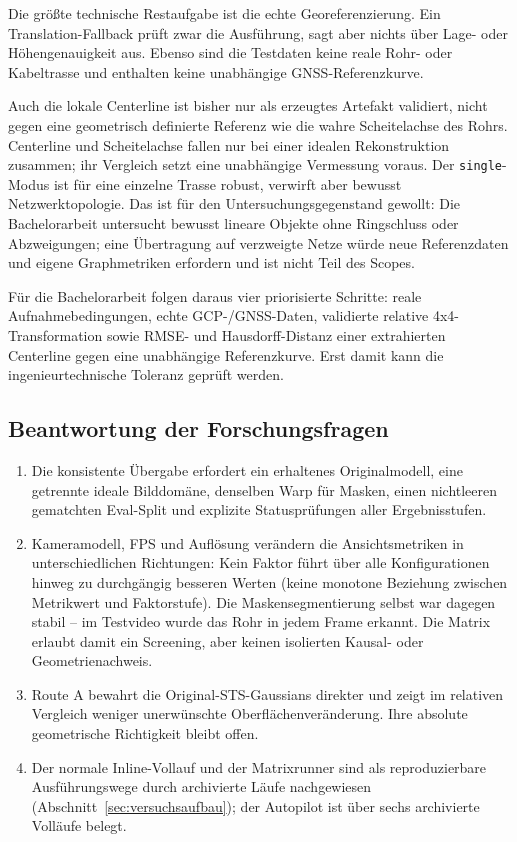 Die größte technische Restaufgabe ist die echte Georeferenzierung. Ein
Translation-Fallback prüft zwar die Ausführung, sagt aber nichts über Lage-
oder Höhengenauigkeit aus. Ebenso sind die Testdaten keine reale Rohr- oder
Kabeltrasse und enthalten keine unabhängige GNSS-Referenzkurve.

Auch die lokale Centerline ist bisher nur als erzeugtes Artefakt validiert,
nicht gegen eine geometrisch definierte Referenz wie die wahre Scheitelachse
des Rohrs. Centerline und Scheitelachse fallen nur bei einer idealen
Rekonstruktion zusammen; ihr Vergleich setzt eine unabhängige Vermessung
voraus. Der \texttt{single}-Modus ist für eine einzelne Trasse robust,
verwirft aber bewusst Netzwerktopologie. Das ist für den Untersuchungsgegenstand
gewollt: Die Bachelorarbeit untersucht bewusst lineare Objekte ohne
Ringschluss oder Abzweigungen; eine Übertragung auf verzweigte Netze würde
neue Referenzdaten und eigene Graphmetriken erfordern und ist nicht Teil des
Scopes.

Für die Bachelorarbeit folgen daraus vier priorisierte Schritte: reale
Aufnahmebedingungen, echte GCP-/GNSS-Daten, validierte relative
4x4-Transformation sowie RMSE- und Hausdorff-Distanz einer extrahierten
Centerline gegen eine unabhängige Referenzkurve. Erst damit kann die
ingenieurtechnische Toleranz geprüft werden.

\subsection{Beantwortung der Forschungsfragen}

\begin{enumerate}
  \item Die konsistente Übergabe erfordert ein erhaltenes Originalmodell, eine
	  getrennte ideale Bilddomäne, denselben Warp für Masken, einen
	  nichtleeren gematchten Eval-Split und explizite Statusprüfungen aller
	  Ergebnisstufen.
  \item Kameramodell, FPS und Auflösung verändern die Ansichtsmetriken in
	  unterschiedlichen Richtungen: Kein Faktor führt über alle Konfigurationen
	  hinweg zu durchgängig besseren Werten (keine monotone Beziehung zwischen
	  Metrikwert und Faktorstufe). Die Maskensegmentierung selbst war dagegen
	  stabil – im Testvideo wurde das Rohr in jedem Frame erkannt. Die Matrix
	  erlaubt damit ein Screening, aber keinen isolierten Kausal- oder
	  Geometrienachweis.
  \item Route A bewahrt die Original-STS-Gaussians direkter und zeigt im
	  relativen Vergleich weniger unerwünschte Oberflächenveränderung. Ihre
	  absolute geometrische Richtigkeit bleibt offen.
  \item Der normale Inline-Vollauf und der Matrixrunner sind als
	  reproduzierbare Ausführungswege durch archivierte Läufe nachgewiesen
	  (Abschnitt~\ref{sec:versuchsaufbau}); der Autopilot ist über sechs
	  archivierte Volläufe belegt.
\end{enumerate}
